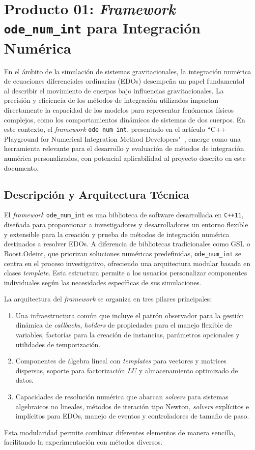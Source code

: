 \section[Producto 01: \textit{Framework} \texttt{ode\_num\_int}]{Producto 01: \textit{Framework} \texttt{ode\_num\_int} para Integración Numérica}\label{sec:ode_num_int}

En el ámbito de la simulación de sistemas gravitacionales, la integración numérica de ecuaciones diferenciales ordinarias (EDOs) desempeña un papel fundamental al describir el movimiento de cuerpos bajo influencias gravitacionales. La precisión y eficiencia de los métodos de integración utilizados impactan directamente la capacidad de los modelos para representar fenómenos físicos complejos, como los comportamientos dinámicos de sistemas de dos cuerpos. En este contexto, el \textit{framework} \texttt{ode\_num\_int}, presentado en el artículo ``C++ Playground for Numerical Integration Method Developers"~\cite{Orlov2017}, emerge como una herramienta relevante para el desarrollo y evaluación de métodos de integración numérica personalizados, con potencial aplicabilidad al proyecto descrito en este documento.

\subsection{Descripción y Arquitectura Técnica}

El \textit{framework} \texttt{ode\_num\_int} es una biblioteca de software desarrollada en \texttt{C++11}, diseñada para proporcionar a investigadores y desarrolladores un entorno flexible y extensible para la creación y prueba de métodos de integración numérica destinados a resolver EDOs. A diferencia de bibliotecas tradicionales como GSL o Boost.Odeint, que priorizan soluciones numéricas predefinidas, \texttt{ode\_num\_int} se centra en el proceso investigativo, ofreciendo una arquitectura modular basada en clases \textit{template}. Esta estructura permite a los usuarios personalizar componentes individuales según las necesidades específicas de sus simulaciones.

La arquitectura del \textit{framework} se organiza en tres pilares principales:
\begin{enumerate} 
    \item Una infraestructura común que incluye el patrón observador para la gestión dinámica de \textit{callbacks}, \textit{holders} de propiedades para el manejo flexible de variables, factorías para la creación de instancias, parámetros opcionales y utilidades de temporización. 
    \item Componentes de álgebra lineal con \textit{templates} para vectores y matrices dispersas, soporte para factorización $LU$ y almacenamiento optimizado de datos. 
    \item Capacidades de resolución numérica que abarcan \textit{solvers} para sistemas algebraicos no lineales, métodos de iteración tipo Newton, \textit{solvers} explícitos e implícitos para EDOs, manejo de eventos y controladores de tamaño de paso. 
\end{enumerate}
Esta modularidad permite combinar diferentes elementos de manera sencilla, facilitando la experimentación con métodos diversos.

